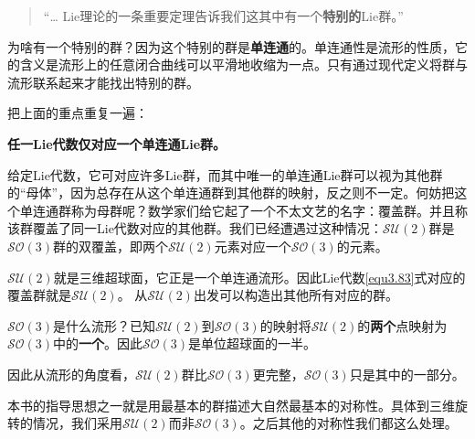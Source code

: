 \begin{quote}
“… Lie理论的一条重要定理告诉我们这其中有一个{\bfseries 特别的}Lie群。”
\end{quote}

为啥有一个特别的群？因为这个特别的群是{\bfseries 单连通}的。单连通性是流形的性质，它的含义是流形上的任意闭合曲线可以平滑地收缩为一点。只有通过现代定义将群与流形联系起来才能找出特别的群。

把上面的重点重复一遍：

{\bfseries 任一Lie代数仅对应一个单连通Lie群。}

给定Lie代数，它可对应许多Lie群，而其中唯一的单连通Lie群可以视为其他群的“母体”，因为总存在从这个单连通群到其他群的映射，反之则不一定。何妨把这个单连通群称为母群呢？数学家们给它起了一个不太文艺的名字：覆盖群。并且称该群覆盖了同一Lie代数对应的其他群。我们已经遭遇过这种情况：$\mathcal{SU}(2)$群是$\mathcal{SO}(3)$群的双覆盖，即两个$\mathcal{SU}(2)$元素对应一个$\mathcal{SO}(3)$的元素。

$\mathcal{SU}(2)$就是三维超球面，它正是一个单连通流形。因此Lie代数\eqref{equ3.83}式对应的覆盖群就是$\mathcal{SU}(2)$。 从$\mathcal{SU}(2)$出发可以构造出其他所有对应的群。

$\mathcal{SO}(3)$是什么流形？已知$\mathcal{SU}(2)$到$\mathcal{SO}(3)$的映射将$\mathcal{SU}(2)$的{\bfseries 两个}点映射为$\mathcal{SO}(3)$中的{\bfseries 一个}。因此$\mathcal{SO}(3)$是单位超球面的一半。


因此从流形的角度看，$\mathcal{SU}(2)$群比$\mathcal{SO}(3)$更完整，$\mathcal{SO}(3)$只是其中的一部分。

本书的指导思想之一就是用最基本的群描述大自然最基本的对称性。具体到三维旋转的情况，我们采用$\mathcal{SU}(2)$而非$\mathcal{SO}(3)$。之后其他的对称性我们都这么处理。

